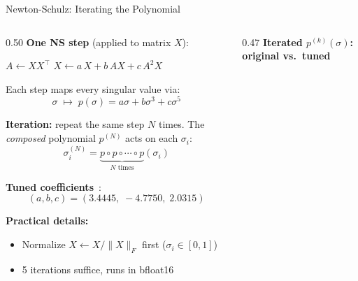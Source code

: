 \begin{frame}{Newton-Schulz: Iterating the Polynomial}

  \begin{columns}[T]
    \begin{column}{0.50\textwidth}
      \textbf{One NS step} (applied to matrix $X$):

      \vspace{0.2em}
      \begin{algorithm}[H]
        \small
        \caption{NS Step}
        $A \gets X X^\top$\;
        $X \gets a\, X + b\, AX + c\, A^2 X$\;
      \end{algorithm}

      Each step maps every singular value via:
      \[
        \sigma \;\mapsto\; p(\sigma) = a\sigma + b\sigma^3 + c\sigma^5
      \]

      \textbf{Iteration:} repeat the same step $N$ times. The \emph{composed} polynomial $p^{(N)}$ acts on each $\sigma_i$:
      \[
        \sigma_i^{(N)} = \underbrace{p \circ p \circ \cdots \circ p}_{N \text{ times}}(\sigma_i)
      \]

      \vspace{0.3em}
      \textbf{Tuned coefficients}~\cite{jordan2024muon}:
      \[
        (a, b, c) = (3.4445,\; -4.7750,\; 2.0315)
      \]

      \textbf{Practical details:}
      \begin{itemize}
        \item Normalize $X \gets X/\|X\|_F$ first ($\sigma_i \in [0, 1]$)
        \item 5 iterations suffice, runs in bfloat16
      \end{itemize}
    \end{column}
    \begin{column}{0.47\textwidth}
      \textbf{Iterated $p^{(k)}(\sigma)$: original vs.\ tuned}

      \vspace{0.2em}
      \begin{center}
\end{center}
\end{column}
\end{columns}
\end{frame}
